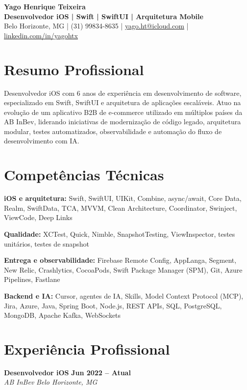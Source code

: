 \documentclass[10pt,a4paper]{article}
\newcommand{\job}[4]{%
  \textbf{#1} \hfill \textbf{#2}\\
  \textit{#3} \hfill \textit{#4}\\[-2pt]
}
\begin{document}
\begin{center}
{\Large\bfseries Yago Henrique Teixeira}\\[3pt]
\textbf{Desenvolvedor iOS | Swift | SwiftUI | Arquitetura Mobile}\\[3pt]
Belo Horizonte, MG \quad | \quad (31) 99834-8635 \quad | \quad
\href{mailto:yago.ht@icloud.com}{yago.ht@icloud.com} \quad | \quad
\href{https://www.linkedin.com/in/yagohtx/}{linkedin.com/in/yagohtx}
\end{center}

\section{Resumo Profissional}

Desenvolvedor iOS com 6 anos de experiência em desenvolvimento de software, especializado em Swift, SwiftUI e arquitetura de aplicações escaláveis. Atuo na evolução de um aplicativo B2B de e-commerce utilizado em múltiplos países da AB InBev, liderando iniciativas de modernização de código legado, arquitetura modular, testes automatizados, observabilidade e automação do fluxo de desenvolvimento com IA.

\section{Competências Técnicas}

\textbf{iOS e arquitetura:} Swift, SwiftUI, UIKit, Combine, async/await, Core Data, Realm, SwiftData, TCA, MVVM, Clean Architecture, Coordinator, Swinject, ViewCode, Deep Links

\textbf{Qualidade:} XCTest, Quick, Nimble, SnapshotTesting, ViewInspector, testes unitários, testes de snapshot

\textbf{Entrega e observabilidade:} Firebase Remote Config, AppLanga, Segment, New Relic, Crashlytics, CocoaPods, Swift Package Manager (SPM), Git, Azure Pipelines, Fastlane

\textbf{Backend e IA:} Cursor, agentes de IA, Skills, Model Context Protocol (MCP), Jira, Azure, Java, Spring Boot, Node.js, REST APIs, SQL, PostgreSQL, MongoDB, Apache Kafka, WebSockets

\section{Experiência Profissional}

\job{Desenvolvedor iOS}{Jun 2022 -- Atual}{AB InBev}{Belo Horizonte, MG}
\end{document}
